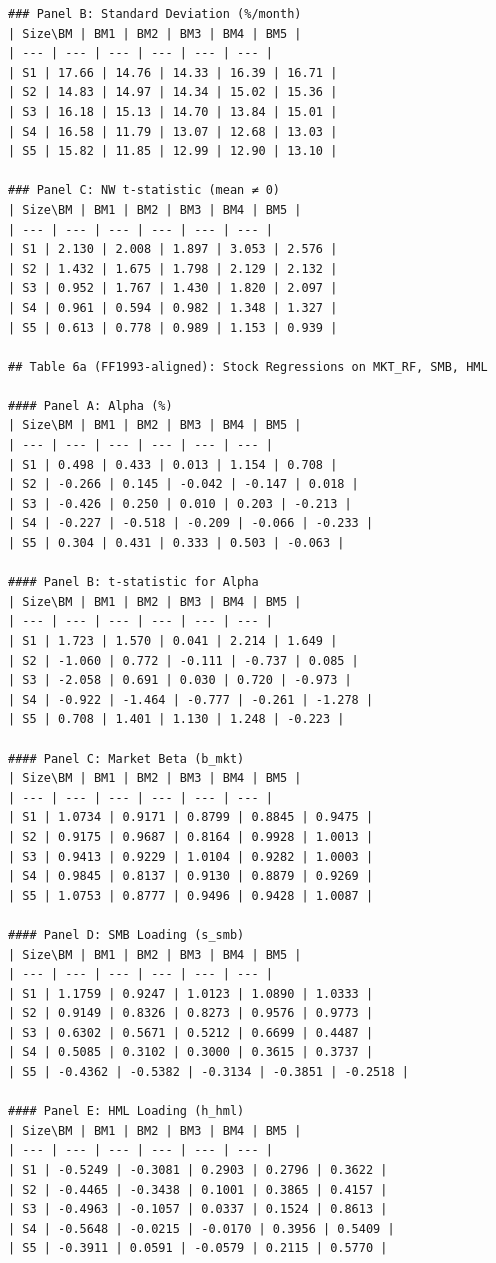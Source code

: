 \begin{verbatim}
### Panel B: Standard Deviation (%/month)
| Size\BM | BM1 | BM2 | BM3 | BM4 | BM5 |
| --- | --- | --- | --- | --- | --- |
| S1 | 17.66 | 14.76 | 14.33 | 16.39 | 16.71 |
| S2 | 14.83 | 14.97 | 14.34 | 15.02 | 15.36 |
| S3 | 16.18 | 15.13 | 14.70 | 13.84 | 15.01 |
| S4 | 16.58 | 11.79 | 13.07 | 12.68 | 13.03 |
| S5 | 15.82 | 11.85 | 12.99 | 12.90 | 13.10 |

### Panel C: NW t-statistic (mean ≠ 0)
| Size\BM | BM1 | BM2 | BM3 | BM4 | BM5 |
| --- | --- | --- | --- | --- | --- |
| S1 | 2.130 | 2.008 | 1.897 | 3.053 | 2.576 |
| S2 | 1.432 | 1.675 | 1.798 | 2.129 | 2.132 |
| S3 | 0.952 | 1.767 | 1.430 | 1.820 | 2.097 |
| S4 | 0.961 | 0.594 | 0.982 | 1.348 | 1.327 |
| S5 | 0.613 | 0.778 | 0.989 | 1.153 | 0.939 |

## Table 6a (FF1993-aligned): Stock Regressions on MKT_RF, SMB, HML

#### Panel A: Alpha (%)
| Size\BM | BM1 | BM2 | BM3 | BM4 | BM5 |
| --- | --- | --- | --- | --- | --- |
| S1 | 0.498 | 0.433 | 0.013 | 1.154 | 0.708 |
| S2 | -0.266 | 0.145 | -0.042 | -0.147 | 0.018 |
| S3 | -0.426 | 0.250 | 0.010 | 0.203 | -0.213 |
| S4 | -0.227 | -0.518 | -0.209 | -0.066 | -0.233 |
| S5 | 0.304 | 0.431 | 0.333 | 0.503 | -0.063 |

#### Panel B: t-statistic for Alpha
| Size\BM | BM1 | BM2 | BM3 | BM4 | BM5 |
| --- | --- | --- | --- | --- | --- |
| S1 | 1.723 | 1.570 | 0.041 | 2.214 | 1.649 |
| S2 | -1.060 | 0.772 | -0.111 | -0.737 | 0.085 |
| S3 | -2.058 | 0.691 | 0.030 | 0.720 | -0.973 |
| S4 | -0.922 | -1.464 | -0.777 | -0.261 | -1.278 |
| S5 | 0.708 | 1.401 | 1.130 | 1.248 | -0.223 |

#### Panel C: Market Beta (b_mkt)
| Size\BM | BM1 | BM2 | BM3 | BM4 | BM5 |
| --- | --- | --- | --- | --- | --- |
| S1 | 1.0734 | 0.9171 | 0.8799 | 0.8845 | 0.9475 |
| S2 | 0.9175 | 0.9687 | 0.8164 | 0.9928 | 1.0013 |
| S3 | 0.9413 | 0.9229 | 1.0104 | 0.9282 | 1.0003 |
| S4 | 0.9845 | 0.8137 | 0.9130 | 0.8879 | 0.9269 |
| S5 | 1.0753 | 0.8777 | 0.9496 | 0.9428 | 1.0087 |

#### Panel D: SMB Loading (s_smb)
| Size\BM | BM1 | BM2 | BM3 | BM4 | BM5 |
| --- | --- | --- | --- | --- | --- |
| S1 | 1.1759 | 0.9247 | 1.0123 | 1.0890 | 1.0333 |
| S2 | 0.9149 | 0.8326 | 0.8273 | 0.9576 | 0.9773 |
| S3 | 0.6302 | 0.5671 | 0.5212 | 0.6699 | 0.4487 |
| S4 | 0.5085 | 0.3102 | 0.3000 | 0.3615 | 0.3737 |
| S5 | -0.4362 | -0.5382 | -0.3134 | -0.3851 | -0.2518 |

#### Panel E: HML Loading (h_hml)
| Size\BM | BM1 | BM2 | BM3 | BM4 | BM5 |
| --- | --- | --- | --- | --- | --- |
| S1 | -0.5249 | -0.3081 | 0.2903 | 0.2796 | 0.3622 |
| S2 | -0.4465 | -0.3438 | 0.1001 | 0.3865 | 0.4157 |
| S3 | -0.4963 | -0.1057 | 0.0337 | 0.1524 | 0.8613 |
| S4 | -0.5648 | -0.0215 | -0.0170 | 0.3956 | 0.5409 |
| S5 | -0.3911 | 0.0591 | -0.0579 | 0.2115 | 0.5770 |


\end{verbatim}
